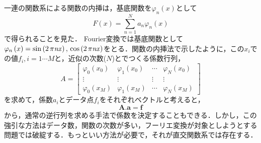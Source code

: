 一連の関数系による関数の内挿は，基底関数を$\varphi_n(x)$として
\begin{equation*}
F(x) = \sum^N_{n=1}a_n \varphi_n(x)
\end{equation*}
で得られることを見た．
Fourier変換では基底関数として$\varphi _{{n}} \left( x \right) =\sin \left( 2\,\pi {\it nx} \right) ,\,\cos \left( 2\,\pi {\it nx} \right)$をとる．関数の内挿法で示したように，この$x_i$での値$f_i, i=1 \cdots M$と，近似の次数($N$)とでつくる係数行列，
\begin{equation*}
A=\left[ \begin{array}{cccc}
\varphi_0(x_0)&\varphi_1(x_0)& \cdots &\varphi_N(x_0) \\
\vdots & \vdots & \vdots & \vdots \\
\varphi_0(x_M)&\varphi_1(x_M)& \cdots &\varphi_N(x_M) 
\end{array}\right]
\end{equation*}
を求めて，係数$a_i$とデータ点$f_i$をそれぞれベクトルと考えると，
\begin{equation*}
\bm{A}.\bm{a} = \bm{f}
\end{equation*}
から，通常の逆行列を求める手法で係数を決定することもできる．しかし，この強引な方法はデータ数，関数の次数が多い，フーリエ変換が対象としようとする問題では破綻する．もっといい方法が必要で，それが直交関数系では存在する．
